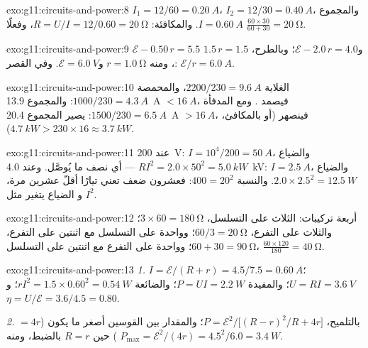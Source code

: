\begin{solution}{exo:g11:circuits-and-power:8}
$I_1 = 12/60 = \qty{0.20}{A}$، $I_2 = 12/30 = \qty{0.40}{A}$، والمجموع
$I = \qty{0.60}{A}$. والمكافئة: $R = U/I = 12/0.60 = \qty{20}{\ohm}$،
وفعلًا $\frac{60 \times 30}{60 + 30} = \qty{20}{\ohm}$.
\end{solution}

\begin{solution}{exo:g11:circuits-and-power:9}
$\mathcal{E} - 0.50\,r = 5.5$ و$\mathcal{E} - 2.0\,r = 4.0$؛
وبالطرح، $1.5\,r = 1.5$، ومنه $r = \qty{1.0}{\ohm}$ و$\mathcal{E} =
\qty{6.0}{V}$. وفي القصر: $\mathcal{E}/r = \qty{6.0}{A}$.
\end{solution}

\begin{solution}{exo:g11:circuits-and-power:10}
الغلاية $2200/230 = \qty{9.6}{A}$، والمحمصة $1000/230 = \qty{4.3}{A}$:
والمجموع \qty{13.9}{A} $< \qty{16}{A}$، فيصمد . ومع المدفأة $1500/230 =
\qty{6.5}{A}$: يصير المجموع \qty{20.4}{A} $> \qty{16}{A}$، فينصهر
(أو بالمكافئ، $\qty{4.7}{kW} > 230 \times 16 \approx \qty{3.7}{kW}$).
\end{solution}

\begin{solution}{exo:g11:circuits-and-power:11}
عند \qty{200}{V}: $I = 10^4/200 = \qty{50}{A}$، والضياع $RI^2 = 2.0 \times
50^2 = \qty{5.0}{kW}$ --- أي نصف ما يُوصَّل. وعند \qty{4.0}{kV}: $I =
\qty{2.5}{A}$، والضياع $2.0 \times 2.5^2 = \qty{12.5}{W}$. والنسبة $400 =
20^2$: فعشرون ضعف  تعني تيارًا أقلّ عشرين مرة، و
الضياع يتغير مثل $I^2$.
\end{solution}

\begin{solution}{exo:g11:circuits-and-power:12}
أربعة تركيبات: الثلاث على التسلسل، $3 \times 60 = \qty{180}{\ohm}$؛ والثلاث على
التفرع، $60/3 = \qty{20}{\ohm}$؛ وواحدة على التسلسل مع اثنتين على التفرع،
$60 + 30 = \qty{90}{\ohm}$؛ وواحدة على التفرع مع اثنتين على التسلسل،
$\frac{60 \times 120}{180} = \qty{40}{\ohm}$.
\end{solution}

\begin{solution}{exo:g11:circuits-and-power:13}
\emph{1.} $I = \mathcal{E}/(R + r) = 4.5/7.5 = \qty{0.60}{A}$؛
$U = RI = \qty{3.6}{V}$؛ والمفيدة $P = UI = \qty{2.2}{W}$؛ والضائعة $rI^2 =
1.5 \times 0.60^2 = \qty{0.54}{W}$؛ و$\eta = U/\mathcal{E} = 3.6/4.5 =
0.80$.

\emph{2.} بالتلميح، $P = \mathcal{E}^2 \big/ \big[(R - r)^2/R +
4r\big]$؛ والمقدار بين القوسين أصغر ما يكون ($= 4r$) حين $R = r$ بالضبط، ومنه
$P_{\max} = \mathcal{E}^2/(4r) = 4.5^2/6.0 = \qty{3.4}{W}$.
\end{solution}


